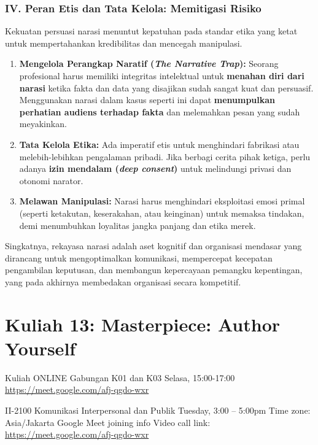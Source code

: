 \documentclass[
  letterpaper,
  DIV=11,
  numbers=noendperiod]{scrreprt}
\providecommand{\tightlist}{%
  \setlength{\itemsep}{0pt}\setlength{\parskip}{0pt}}
\begin{document}
\subsection{IV. Peran Etis dan Tata Kelola: Memitigasi
Risiko}\label{iv.-peran-etis-dan-tata-kelola-memitigasi-risiko}

Kekuatan persuasi narasi menuntut kepatuhan pada standar etika yang
ketat untuk mempertahankan kredibilitas dan mencegah manipulasi.

\begin{enumerate}
\def\labelenumi{\arabic{enumi}.}
\tightlist
\item
  \textbf{Mengelola Perangkap Naratif (\emph{The Narrative Trap}):}
  Seorang profesional harus memiliki integritas intelektual untuk
  \textbf{menahan diri dari narasi} ketika fakta dan data yang disajikan
  sudah sangat kuat dan persuasif. Menggunakan narasi dalam kasus
  seperti ini dapat \textbf{menumpulkan perhatian audiens terhadap
  fakta} dan melemahkan pesan yang sudah meyakinkan.
\item
  \textbf{Tata Kelola Etika:} Ada imperatif etis untuk menghindari
  fabrikasi atau melebih-lebihkan pengalaman pribadi. Jika berbagi
  cerita pihak ketiga, perlu adanya \textbf{izin mendalam (\emph{deep
  consent})} untuk melindungi privasi dan otonomi narator.
\item
  \textbf{Melawan Manipulasi:} Narasi harus menghindari eksploitasi
  emosi primal (seperti ketakutan, keserakahan, atau keinginan) untuk
  memaksa tindakan, demi menumbuhkan loyalitas jangka panjang dan etika
  merek.
\end{enumerate}

Singkatnya, rekayasa narasi adalah aset kognitif dan organisasi mendasar
yang dirancang untuk mengoptimalkan komunikasi, mempercepat kecepatan
pengambilan keputusan, dan membangun kepercayaan pemangku kepentingan,
yang pada akhirnya membedakan organisasi secara kompetitif.


\chapter{Kuliah 13: Masterpiece: Author
Yourself}\label{kuliah-13-masterpiece-author-yourself}

\begin{tcolorbox}[enhanced jigsaw, breakable, rightrule=.15mm, colbacktitle=quarto-callout-important-color!10!white, opacityback=0, titlerule=0mm, leftrule=.75mm, bottomrule=.15mm, toptitle=1mm, colframe=quarto-callout-important-color-frame, bottomtitle=1mm, arc=.35mm, coltitle=black, opacitybacktitle=0.6, toprule=.15mm, left=2mm, title=\textcolor{quarto-callout-important-color}{\faExclamation}\hspace{0.5em}{Important}, colback=white]

Kuliah ONLINE Gabungan K01 dan K03 Selasa, 15:00-17:00
\url{https://meet.google.com/afj-qgdo-wxr}

II-2100 Komunikasi Interpersonal dan Publik Tuesday, 3:00 -- 5:00pm Time
zone: Asia/Jakarta Google Meet joining info Video call link:
\url{https://meet.google.com/afj-qgdo-wxr}

\end{tcolorbox}
\end{document}
